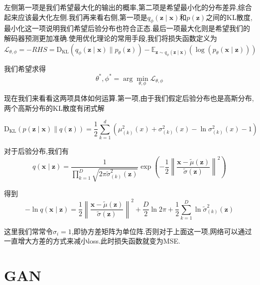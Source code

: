 	左侧第一项是我们希望最大化的输出的概率,第二项是希望最小化的分布差异,综合起来应该最大化左侧.我们再来看右侧,第一项是$q_{\phi}(\bm{z} \mid \bm{x})$和$p(\bm z)$之间的KL散度,最小化这一项说明我们希望后验分布也符合正态.最后一项最大化则是希望我们的解码器预测更加准确.使用优化理论的常用手段,我们将损失函数定义为
	\begin{equation}
		\mathcal{L}_{\theta, \phi} = -RHS = \operatorname{D_{KL}}\left(q_{\phi}(\bm{z} \mid \bm{x}) \| p_{\theta}(\bm{z})\right)-\mathbb E_{\bm{z} \sim q_{\phi}(\bm{z} \mid \bm{x})}\left(\log \left(p_{\theta}(\bm{x} \mid \bm{z})\right)\right)
	\end{equation}

	我们希望求得
	\begin{equation}
		\theta^{*}, \phi^{*} = \arg\min_{\theta, \phi} \mathcal{L}_{\theta, \phi}
	\end{equation}

	现在我们来看看这两项具体如何运算.第一项,由于我们假定后验分布也是高斯分布,两个高斯分布的KL散度有闭式解
	
	\begin{equation}
		\operatorname{D_{KL}}(p(\bm z \mid \bm x) \| q(\bm z))=\frac{1}{2} \sum_{k=1}^{d}\left(\mu_{(k)}^{2}(x)+\sigma_{(k)}^{2}(x)-\ln \sigma_{(k)}^{2}(x)-1\right)
	\end{equation}
	
	对于后验分布,我们有
	\begin{equation}
		q(\bm x \mid \bm z)=\frac{1}{\prod_{k=1}^{D} \sqrt{2 \pi \tilde{\sigma}_{(k)}^{2}(\bm z)}} \exp \left(-\frac{1}{2}\left\|\frac{\bm x-\tilde{\mu}(\bm z)}{\tilde{\sigma}(\bm z)}\right\|^{2}\right)
	\end{equation}

	得到
	\begin{equation}
		-\ln q(\bm x \mid \bm z)=\frac{1}{2}\left\|\frac{\bm x-\tilde{\mu}(\bm z)}{\tilde{\sigma}(\bm z)}\right\|^{2}+\frac{D}{2} \ln 2 \pi+\frac{1}{2} \sum_{k=1}^{D} \ln \tilde{\sigma}_{(k)}^{2}(\bm z)
	\end{equation}

	这里我们常常令$\sigma_i = 1$,即协方差矩阵为单位阵.否则对于上面这一项,网络可以通过一直增大方差的方式来减小loss.此时损失函数就变为MSE.
	
	\clearpage
	
	\section{GAN}
	
